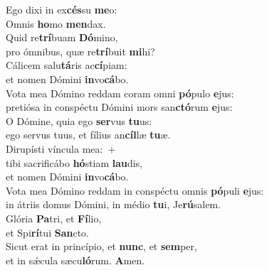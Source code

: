 \evenverse Ego dixi in ex\textbf{cés}su \textbf{me}o:~\*\\
\evenverse Omnis \textbf{ho}mo \textbf{men}dax.\\
\oddverse Quid re\textbf{trí}buam \textbf{Dó}mino,~\*\\
\oddverse pro ómnibus, quæ re\textbf{trí}buit \textbf{mi}hi?\\
\evenverse Cálicem salu\textbf{tá}ris ac\textbf{cí}piam:~\*\\
\evenverse et nomen Dómini \textbf{in}vo\textbf{cá}bo.\\
\oddverse Vota mea Dómino reddam coram omni \textbf{pó}pulo \textbf{e}jus:~\*\\
\oddverse pretiósa in conspéctu Dómini mors san\textbf{ctó}rum \textbf{e}jus:\\
\evenverse O Dómine, quia ego \textbf{ser}vus \textbf{tu}us:~\*\\
\evenverse ego servus tuus, et fílius an\textbf{cíl}læ \textbf{tu}æ.\\
\oddverse Dirupísti víncula mea:~+\\
\oddverse  tibi sacrificábo \textbf{hó}stiam \textbf{lau}dis,~\*\\
\oddverse et nomen Dómini \textbf{in}vo\textbf{cá}bo.\\
\evenverse Vota mea Dómino reddam in conspéctu omnis \textbf{pó}puli \textbf{e}jus:~\*\\
\evenverse in átriis domus Dómini, in médio \textbf{tu}i, Je\textbf{rú}salem.\\
\oddverse Glória \textbf{Pa}tri, et \textbf{Fí}lio,~\*\\
\oddverse et Spi\textbf{rí}tui \textbf{San}cto.\\
\evenverse Sicut erat in princípio, et \textbf{nunc}, et \textbf{sem}per,~\*\\
\evenverse et in sǽcula sæcu\textbf{ló}rum. \textbf{A}men.\\
